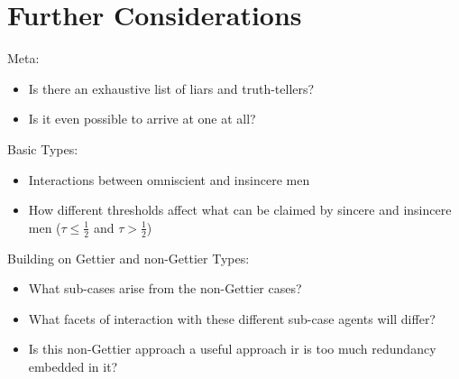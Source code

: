 \documentclass[12pt, titlepage, twoside]{report}
\begin{document}
\chapter{Further Considerations}
Meta:
\begin{itemize}
\item Is there an exhaustive list of liars and truth-tellers?
\item Is it even possible to arrive at one at all?
\end{itemize}
Basic Types:
\begin{itemize}
\item Interactions between omniscient and insincere men
\item How different thresholds affect what can be claimed by sincere and insincere men ($\tau \leq \frac{1}{2}$ and $\tau > \frac{1}{2}$)
\end{itemize}
Building on Gettier and non-Gettier Types:
\begin{itemize}
\item What sub-cases arise from the non-Gettier cases?\item What facets of interaction with these different sub-case agents will differ?
\item Is this non-Gettier approach a useful approach ir is too much redundancy embedded in it?
\end{itemize}

\printbibliography
\end{document}
